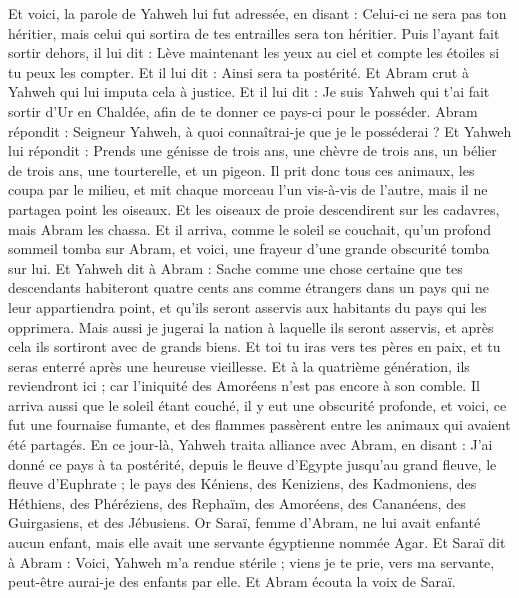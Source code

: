 \begin{multicols}{2}
Et voici, la parole de Yahweh lui fut adressée, en disant : Celui-ci ne sera pas ton héritier, mais celui qui sortira de tes entrailles sera ton héritier.
Puis l'ayant fait sortir dehors, il lui dit : Lève maintenant les yeux au ciel et compte les étoiles si tu peux les compter. Et il lui dit : Ainsi sera ta postérité.
Et Abram crut à Yahweh qui lui imputa cela à justice.
Et il lui dit : Je suis Yahweh qui t'ai fait sortir d'Ur en Chaldée, afin de te donner ce pays-ci pour le posséder.
Abram répondit : Seigneur Yahweh, à quoi connaîtrai-je que je le posséderai ?
Et Yahweh lui répondit : Prends une génisse de trois ans, une chèvre de trois ans, un bélier de trois ans, une tourterelle, et un pigeon.
Il prit donc tous ces animaux, les coupa par le milieu, et mit chaque morceau l'un vis-à-vis de l'autre, mais il ne partagea point les oiseaux.
Et les oiseaux de proie descendirent sur les cadavres, mais Abram les chassa.
Et il arriva, comme le soleil se couchait, qu'un profond sommeil tomba sur Abram, et voici, une frayeur d'une grande obscurité tomba sur lui.
Et Yahweh dit à Abram : Sache comme une chose certaine que tes descendants habiteront quatre cents ans comme étrangers dans un pays qui ne leur appartiendra point, et qu'ils seront asservis aux habitants du pays qui les opprimera.
Mais aussi je jugerai la nation à laquelle ils seront asservis, et après cela ils sortiront avec de grands biens.
Et toi tu iras vers tes pères en paix, et tu seras enterré après une heureuse vieillesse.
Et à la quatrième génération, ils reviendront ici ; car l'iniquité des Amoréens n'est pas encore à son comble.
Il arriva aussi que le soleil étant couché, il y eut une obscurité profonde, et voici, ce fut une fournaise fumante, et des flammes passèrent entre les animaux qui avaient été partagés.
En ce jour-là, Yahweh traita alliance avec Abram, en disant : J'ai donné ce pays à ta postérité, depuis le fleuve d'Egypte jusqu'au grand fleuve, le fleuve d'Euphrate ;
le pays des Kéniens, des Keniziens, des Kadmoniens,
des Héthiens, des Phéréziens, des Rephaïm,
des Amoréens, des Cananéens, des Guirgasiens, et des Jébusiens.
\VerseOne{}Or Saraï, femme d'Abram, ne lui avait enfanté aucun enfant, mais elle avait une servante égyptienne nommée Agar.
Et Saraï dit à Abram : Voici, Yahweh m'a rendue stérile ; viens je te prie, vers ma servante, peut-être aurai-je des enfants par elle. Et Abram écouta la voix de Saraï.

\end{multicols}
